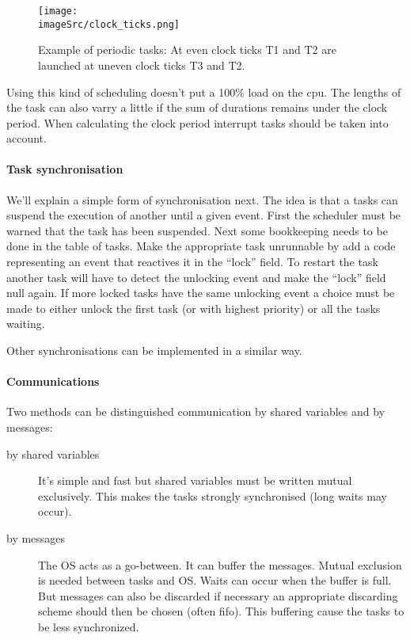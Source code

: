\documentclass[../main.tex]{subfiles}
\renewcommand{\imageSrc}{../images/}
\begin{document}
\begin{figure}
	\centering
	\texttt{[image: \\imageSrc/clock\_ticks.png]}
	\caption{Example of periodic tasks: At even clock ticks T1 and T2 are launched at uneven clock ticks T3 and T2.}
	\label{f:perd_ex}
\end{figure}

Using this kind of scheduling doesn't put a 100\% load on the cpu.
The lengths of the task can also varry a little if the sum of durations remains under the clock period.
When calculating the clock period interrupt tasks should be taken into account.

\paragraph{Task synchronisation}
We'll explain a simple form of synchronisation next. 
The idea is that a tasks can suspend the execution of another until a given event.
First the scheduler must be warned that the task has been suspended.
Next some bookkeeping needs to be done in the table of tasks.
Make the appropriate task unrunnable by add a code representing an event that reactives it in the ``lock'' field.
To restart the task another task will have to detect the unlocking event and make the ``lock'' field null again. 
If more locked tasks have the same unlocking event a choice must be made to either unlock the first task (or with highest priority) or all the tasks waiting. 

Other synchronisations can be implemented in a similar way.

\paragraph{Communications}
Two methods can be distinguished communication by shared variables and by messages:
\begin{description}
	\item[by shared variables] It's simple and fast but shared variables must be written mutual exclusively. This makes the tasks strongly synchronised (long waits may occur).
	\item[by messages] The OS acts as a go-between. It can buffer the messages. Mutual exclusion is needed between tasks and OS. Waits can occur when the buffer is full. But messages can also be discarded if necessary an appropriate discarding scheme should then be chosen (often fifo). This buffering cause the tasks to be less synchronized.
\end{description} 
\end{document}
